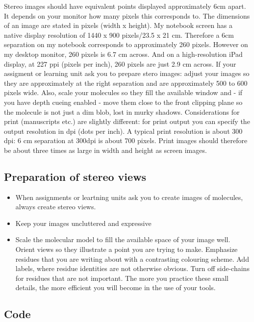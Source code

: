 \documentclass[]{book}
\providecommand{\tightlist}{%
  \setlength{\itemsep}{0pt}\setlength{\parskip}{0pt}}
\begin{document}
Stereo images should have equivalent points displayed approximately 6cm
apart. It depends on your monitor how many pixels this corresponds to.
The dimensions of an image are stated in pixels (width x height). My
notebook screen has a native display resolution of 1440 x 900
pixels/23.5 x 21 cm. Therefore a 6cm separation on my notebook
corresponds to approximately 260 pixels. However on my desktop monitor,
260 pixels is 6.7 cm across. And on a high-resolution iPad display, at
227 ppi (pixels per inch), 260 pixels are just 2.9 cm across. If your
assigment or learning unit ask you to prepare stero images: adjust your
images so they are approximately at the right separation and are
approximately 500 to 600 pixels wide. Also, scale your molecules so they
fill the available window and - if you have depth cueing enabled - move
them close to the front clipping plane so the molecule is not just a dim
blob, lost in murky shadows. Considerations for print (manuscripts etc.)
are slightly different: for print output you can specify the output
resolution in dpi (dots per inch). A typical print resolution is about
300 dpi: 6 cm separation at 300dpi is about 700 pixels. Print images
should therefore be about three times as large in width and height as
screen images.

\subsection{Preparation of stereo
views}\label{preparation-of-stereo-views}

\begin{itemize}
\tightlist
\item
  When assignments or leartning units ask you to create images of
  molecules, always create stereo views.
\item
  Keep your images uncluttered and expressive
\item
  Scale the molecular model to fill the available space of your image
  well. Orient views so they illustrate a point you are trying to make.
  Emphasize residues that you are writing about with a contrasting
  colouring scheme. Add labels, where residue identities are not
  otherwise obvious. Turn off side-chains for residues that are not
  important. The more you practice these small details, the more
  efficient you will become in the use of your tools.
\end{itemize}

\subsection{Code}\label{code}
\end{document}
